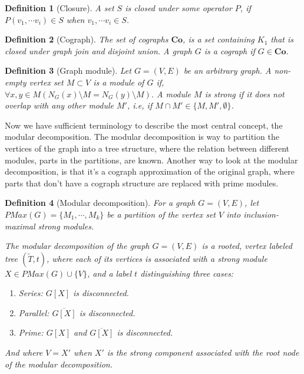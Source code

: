 \documentclass{amsart}
\newtheorem{definition}{Definition}[section]
\begin{document}
\begin{definition}[Closure]
    A set $S$ is closed under some operator $P$, if 
    $ P(v_1,\cdots v_i) \in S$ when $v_1,\cdots v_i \in S$.
\end{definition}

\begin{definition}[Cograph]
    The set of cographs $\textbf{Co}$, is a set containing $K_1$ that is closed under 
    graph join and disjoint union. A graph $G$ is a cograph if $G \in \textbf{Co}$.
\end{definition}


\begin{definition}[Graph module]
    Let $G = (V,E)$ be an arbitrary graph. A non-empty vertex set $M \subset V$
    is a module of $G$ if, $\forall x,y \in M (N_G(x) \setminus M = N_G(y) \setminus M)  $. A module $M$ is
    strong if it does not overlap with any other module $M'$, i.e, if 
    $M \cap M' \in \{M,M',\emptyset \}$.
\end{definition}
  

Now we have sufficient terminology to describe the most central concept, the
modular decomposition. The modular decomposition is way to partition the
vertices of the graph into a tree structure, where the relation between
different modules, parts in the partitions, are known. Another way to look at
the modular decomposition, is that it's a cograph approximation of the original
graph, where parts that don't have a cograph structure are replaced with prime
modules.

\begin{definition}[Modular decomposition]
    For a graph $G = (V,E)$, let $PMax(G) = \{M_1,\cdots,M_k\}$ be a partition of the vertex set $V$ 
    into inclusion-maximal strong modules.
    
    The modular decomposition of the graph $G = (V,E)$ is a rooted, vertex labeled tree
    $(\widetilde{T},t)$, where each of its vertices is associated with a strong
    module $X \in PMax(G) \cup \{V\}$, and a label $t$ distinguishing  three cases:

    \begin{enumerate}
        \item Series: $G[X]$ is disconnected.
        \item Parallel: $\overline{G[X]}$ is disconnected.
        \item Prime: $G[X]$ and $\overline{G[X]}$ is disconnected.
    \end{enumerate}

    And where $V = X'$ when $X'$ is the strong component associated with the
    root node of the modular decomposition.
\end{definition}
\end{document}
